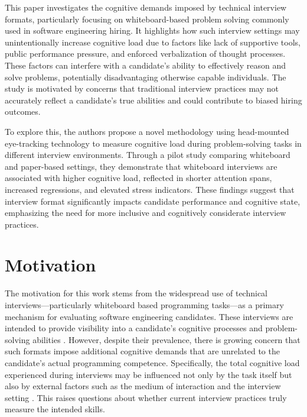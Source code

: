 This paper investigates the cognitive demands imposed by technical interview formats, particularly focusing on whiteboard-based problem solving commonly used in software engineering hiring. It highlights how such interview settings may unintentionally increase cognitive load due to factors like lack of supportive tools, public performance pressure, and enforced verbalization of thought processes. These factors can interfere with a candidate's ability to effectively reason and solve problems, potentially disadvantaging otherwise capable individuals. The study is motivated by concerns that traditional interview practices may not accurately reflect a candidate's true abilities and could contribute to biased hiring outcomes.

To explore this, the authors propose a novel methodology using head-mounted eye-tracking technology to measure cognitive load during problem-solving tasks in different interview environments. Through a pilot study comparing whiteboard and paper-based settings, they demonstrate that whiteboard interviews are associated with higher cognitive load, reflected in shorter attention spans, increased regressions, and elevated stress indicators. These findings suggest that interview format significantly impacts candidate performance and cognitive state, emphasizing the need for more inclusive and cognitively considerate interview practices.

\section{Motivation}
The motivation for this work stems from the widespread use of technical interviews—particularly whiteboard based programming tasks—as a primary mechanism for evaluating software engineering candidates. These interviews are intended to provide visibility into a candidate's cognitive processes and problem-solving abilities \cite{8_Ford2017}. However, despite their prevalence, there is growing concern that such formats impose additional cognitive demands that are unrelated to the candidate's actual programming competence. Specifically, the total cognitive load experienced during interviews may be influenced not only by the task itself but also by external factors such as the medium of interaction and the interview setting \cite{14_Paas_1994}. This raises questions about whether current interview practices truly measure the intended skills.

